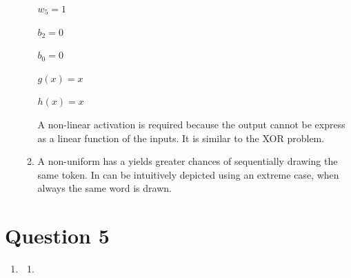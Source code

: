 \documentclass{article}
\begin{document}
\begin{enumerate}[label = (\alph*)]
\begin{enumerate}[label = (\roman*)]
    $w_5=1$
    
    $b_2=0$
    
    $b_0=0$
    
    $g(x) = x$
    
    $h(x) = x$
    
    A non-linear activation is required because the output cannot be express as a linear function of the inputs. It is similar to the XOR problem. 
    
    \item
    A non-uniform has a yields greater chances of sequentially drawing the same token. 
    In can be intuitively depicted using an extreme case, when always the same word is drawn. 
    
	\end{enumerate}
    
\end{enumerate}



\section*{Question 5} 
\begin{enumerate}[label = (\alph*)]
    \item
    \begin{enumerate}[label = (\roman*)]
    \item

	\end{enumerate}
\end{enumerate}


\clearpage
\newpage
\end{document}
